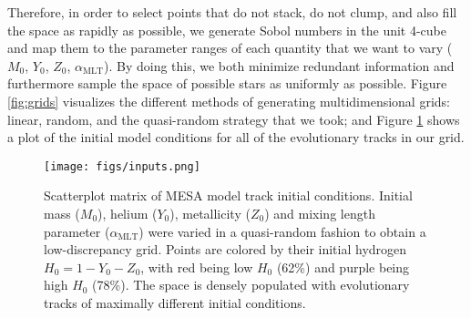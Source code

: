 \documentclass[a4paper,fleqn,usenatbib,useAMS]{mnras}
\begin{document}
Therefore, in order to select points that do not stack, do not clump, and also fill the space as rapidly as possible, we generate Sobol numbers \citep{sobol1967distribution} in the unit 4-cube and map them to the parameter ranges of each quantity that we want to vary ($M_0$, $Y_0$, $Z_0$, $\alpha_{\text{MLT}}$). By doing this, we both minimize redundant information and furthermore sample the space of possible stars as uniformly as possible. Figure \ref{fig:grids} visualizes the different methods of generating multidimensional grids: linear, random, and the quasi-random strategy that we took; and Figure \ref{fig:inputs} shows a plot of the initial model conditions for all of the evolutionary tracks in our grid. 

\begin{figure*}
\centering
{}%
{}%
{}%
\caption{Methods of generating multidimensional grids. Linear grids exhaust each dimension uniformly, but with all points stacked on top of each other, so the unit cube is filled very slowly. Random grids fill the unit cube more rapidly, but points tend to clump up and leave large gaps in the parameter space. Quasi-random grids achieve the best of both worlds and fill the unit cube most rapidly by generating points that are maximally distant along all dimensions. }%
\label{fig:grids}
\end{figure*}

\begin{figure}
\centering
\texttt{[image: figs/inputs.png]}%
\caption{Scatterplot matrix of MESA model track initial conditions. Initial mass ($M_0$), helium ($Y_0$), metallicity ($Z_0$) and mixing length parameter ($\alpha_{\text{MLT}}$) were varied in a quasi-random fashion to obtain a low-discrepancy grid. Points are colored by their initial hydrogen $H_0=1-Y_0-Z_0$, with red being low $H_0$ (62\%) and purple being high $H_0$ (78\%). The space is densely populated with evolutionary tracks of maximally different initial conditions.}%
\label{fig:inputs}
\end{figure}
\end{document}
